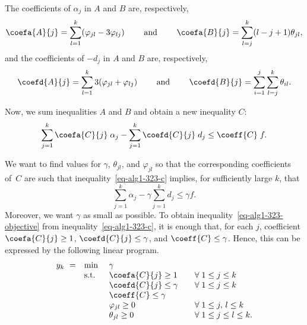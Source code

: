 The coefficients of $\alpha_j$ in $A$ and $B$ are, respectively,
\begin{equation*}\label{eq-alg1-323-coefa}
  \coefa{A}{j} = \sum_{l=1}^{k} (\varphi_{jl} - 3 \varphi_{lj})
  \qquad\mbox{ and }\qquad
  \coefa{B}{j} = \sum_{l=j}^k (l - j + 1) \theta_{jl},
\end{equation*}
and the coefficients of $-d_j$ in $A$ and $B$ are, respectively,
\begin{equation*}\label{eq-alg1-323-coefd}
  \coefd{A}{j} = \sum_{l=1}^{k} 3 (\varphi_{jl} + \varphi_{lj})
  \qquad\mbox{ and }\qquad
  \coefd{B}{j} = \sum_{i=1}^{j} \sum_{l = j}^{k} \theta_{il}.
\end{equation*}

Now, we sum inequalities $A$ and $B$ and obtain a new inequality $C$:
\begin{equation}\label{eq-alg1-323-c}
 \sum_{j=1}^{k} \coefa{C}{j} \; \alpha_j - \sum_{j=1}^{k} \coefd{C}{j} \; d_j \le \coeff{C} \; f.
\end{equation}

We want to find values for $\gamma$, $\theta_{jl}$, and $\varphi_{jl}$ so that
the corresponding coefficients of~$C$ are such that inequality~\eqref{eq-alg1-323-c}
implies, for sufficiently large $k$, that
\begin{equation}\label{eq-alg1-323-objective}
 \sum_{j=1}^{k} \alpha_j - \gamma \sum_{j=1}^{k} d_j \le \gamma f.
\end{equation}
Moreover, we want $\gamma$ as small as possible.
To obtain inequality~\eqref{eq-alg1-323-objective} from
inequality~\eqref{eq-alg1-323-c}, it is enough that, for each $j$, coefficient
$\coefa{C}{j} \ge 1$, $\coefd{C}{j} \le \gamma$, and $\coeff{C} \le \gamma$.
Hence, this can be expressed by the following linear program.
\begin{equation}\label{program-alg1-dual-tres}
\begin{array}{rlll}
y_k \ = & \mbox{\rm min }   & \gamma  \\
      & \mbox{\rm s.t.}  & \coefa{C}{j} \ge 1
                               & \quad \forall \; 1 \le j \le k \\
      &                        & \coefd{C}{j} \le \gamma
                               & \quad \forall \; 1 \le j \le k \\
      &                        & \coeff{C} \le \gamma
                               & \\
      &                        & \varphi_{jl} \ge 0
                               & \quad \forall \; 1 \le j, \, l \le k \\
      &                        & \theta_{jl} \ge 0
                               & \quad \forall \; 1 \le j \le l \le k.
\end{array}
\end{equation}

